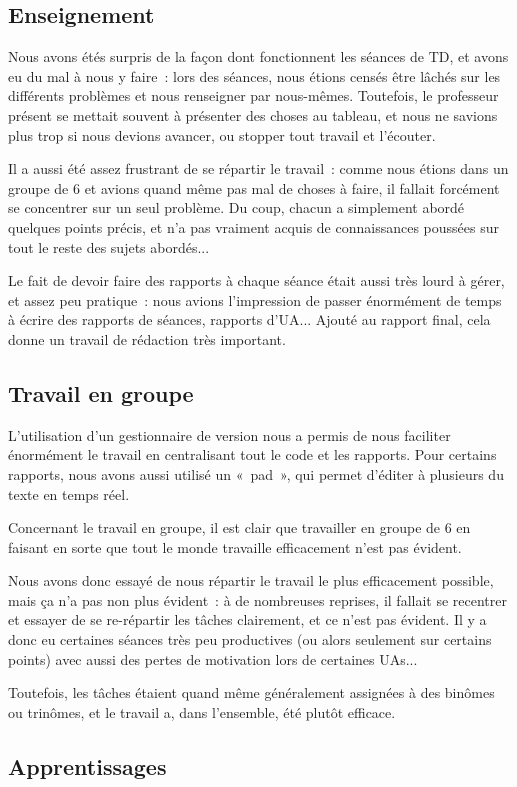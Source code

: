 
\subsection{Enseignement}

Nous avons étés surpris de la façon dont fonctionnent
les séances de TD, et avons eu du mal à nous y faire~:
lors des séances, nous étions censés être lâchés sur les
différents problèmes et nous renseigner par nous-mêmes.
Toutefois, le professeur présent se mettait souvent à présenter
des choses au tableau, et nous ne savions plus trop si nous
devions avancer, ou stopper tout travail et l'écouter.

Il a aussi été assez frustrant de se répartir le travail~:
comme nous étions dans un groupe de 6 et avions quand même
pas mal de choses à faire, il fallait forcément se concentrer
sur un seul problème. Du coup, chacun a simplement abordé
quelques points précis, et n'a pas vraiment acquis de connaissances
poussées sur tout le reste des sujets abordés...

Le fait de devoir faire des rapports à chaque séance était aussi
très lourd à gérer, et assez peu pratique~: nous avions l'impression
de passer énormément de temps à écrire des rapports de séances,
rapports d'UA... Ajouté au rapport final, cela donne un travail
de rédaction très important.

\subsection{Travail en groupe} %

L'utilisation d'un gestionnaire de version nous a permis de nous
faciliter énormément le travail en centralisant tout le code et les rapports.
Pour certains rapports, nous avons aussi utilisé un «~pad~», qui permet
d'éditer à plusieurs du texte en temps réel.

Concernant le travail en groupe, il est clair que travailler en groupe de 6
en faisant en sorte que tout le monde travaille efficacement n'est pas évident.

Nous avons donc essayé de nous répartir le travail le plus efficacement possible,
mais ça n'a pas non plus évident~: à de nombreuses reprises, il fallait se recentrer
et essayer de se re-répartir les tâches clairement, et ce n'est pas évident.
Il y a donc eu certaines séances très peu productives (ou alors seulement
sur certains points) avec aussi des pertes de motivation lors de certaines UAs...

Toutefois, les tâches étaient quand même généralement assignées à des binômes ou trinômes,
et le travail a, dans l'ensemble, été plutôt efficace. %

\subsection{Apprentissages}

